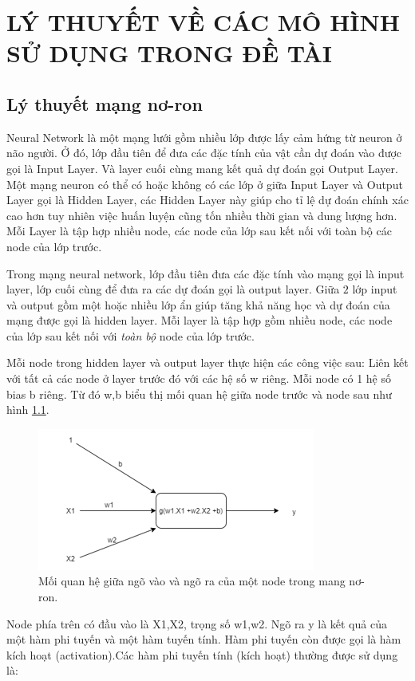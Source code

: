 \chapter{LÝ THUYẾT VỀ CÁC MÔ HÌNH SỬ DỤNG TRONG ĐỀ TÀI}
\section{Lý thuyết mạng nơ-ron}
Neural Network là một mạng lưới gồm nhiều lớp được lấy cảm hứng từ neuron ở não người. Ở đó, lớp đầu tiên để đưa các đặc tính của vật cần dự đoán vào được gọi là Input Layer. Và layer cuối cùng mang kết quả dự đoán gọi Output Layer. Một mạng neuron có thể có hoặc không có các lớp ở giữa Input Layer và Output Layer gọi là Hidden Layer, các Hidden Layer này giúp cho tỉ lệ dự đoán chính xác cao hơn tuy nhiên việc huấn luyện cũng tốn nhiều thời gian và dung lượng hơn. Mỗi Layer là tập hợp nhiều node, các node của lớp sau kết nối với toàn bộ các node của lớp trước.\par
Trong mạng neural network, lớp đầu tiên đưa các đặc tính vào mạng gọi là input layer, lớp cuối cùng để đưa ra các dự đoán gọi là output layer. Giữa $2$ lớp input và output gồm một hoặc nhiều lớp ẩn giúp tăng khả năng học và dự đoán của mạng được gọi là hidden layer. Mỗi layer là tập hợp gồm nhiều node, các node của lớp sau kết nối với \textit{toàn bộ} node của lớp trước.\par
Mỗi node trong hidden layer và output layer thực hiện các công việc sau: Liên kết với tất cả các node ở layer trước đó với các hệ số w riêng. Mỗi node có 1 hệ số bias b riêng. Từ đó w,b biểu thị mối quan hệ giữa node trước và node sau như hình \ref{fig:neural1}.\par
\begin{figure}[ht!]
\centerline{\includegraphics[scale=0.7]{images/neural1.PNG}}
\caption{Mối quan hệ giữa ngõ vào và ngõ ra của một node trong mang nơ-ron.}
\label{fig:neural1}
\end{figure}
Node phía trên có đầu vào là X1,X2, trọng số w1,w2. Ngõ ra y là kết quả của một hàm phi tuyến và một hàm tuyến tính. Hàm phi tuyến còn được gọi là hàm kích hoạt (activation).Các hàm phi tuyến tính (kích hoạt) thường được sử dụng là:\\
